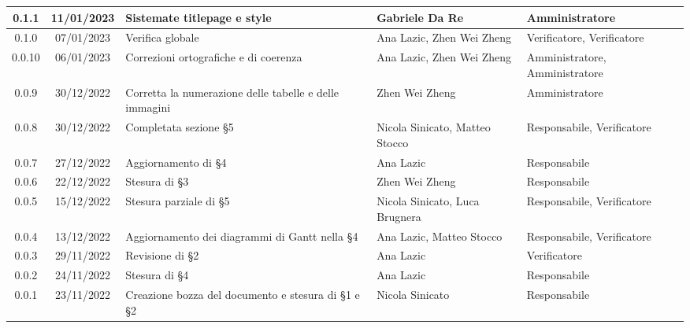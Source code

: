 \begin{center}
\begin{tabularx}{\textwidth}{| c | c | X | X | X |}
    		\hline
		0.1.1 & 11/01/2023 & Sistemate titlepage e style & Gabriele Da Re & Amministratore \\
	  	\hline
		0.1.0 & 07/01/2023 & Verifica globale & Ana Lazic, Zhen Wei Zheng & Verificatore, Verificatore \\
	  	\hline
		0.0.10 & 06/01/2023 & Correzioni ortografiche e di coerenza & Ana Lazic, Zhen Wei Zheng & Amministratore, Amministratore \\
		\hline
		0.0.9 & 30/12/2022 & Corretta la numerazione delle tabelle e delle immagini & Zhen Wei Zheng & Amministratore\\
		\hline
		0.0.8 & 30/12/2022 & Completata sezione §5 & Nicola Sinicato, Matteo Stocco & Responsabile, Verificatore\\
		\hline
		0.0.7 & 27/12/2022 & Aggiornamento di §4 & Ana Lazic & 	Responsabile\\
		\hline
		0.0.6 & 22/12/2022 & Stesura di §3 & Zhen Wei Zheng & Responsabile\\
		\hline
		0.0.5 & 15/12/2022 & Stesura parziale di §5 & Nicola Sinicato, Luca Brugnera & Responsabile, Verificatore\\
		\hline
		0.0.4 & 13/12/2022 & Aggiornamento dei diagrammi di Gantt nella §4 & Ana Lazic, Matteo Stocco & Responsabile, Verificatore\\
		\hline
		0.0.3 & 29/11/2022 & Revisione di §2 & Ana Lazic & Verificatore\\
		\hline
		0.0.2 & 24/11/2022 & Stesura di §4 & Ana Lazic & Responsabile\\
		\hline
		0.0.1 & 23/11/2022 & Creazione bozza del documento e stesura di §1 e §2 & Nicola Sinicato & Responsabile\\
		\hline
	\end{tabularx}
\end{center}
	
	

